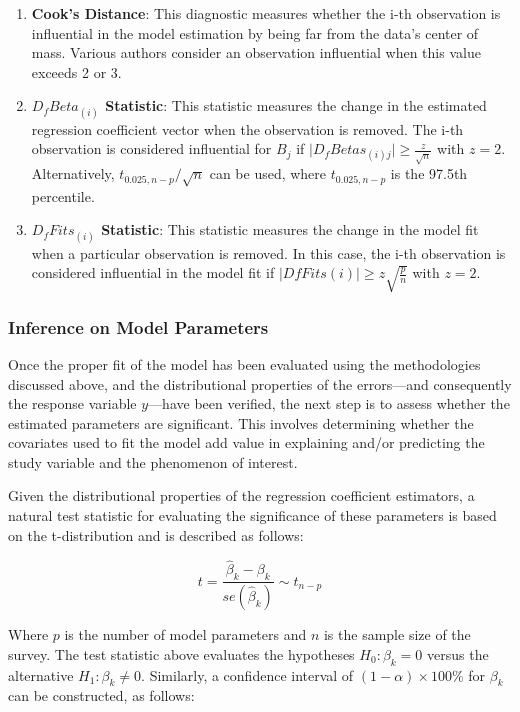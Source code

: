 \documentclass[
  12pt,
]{book}
\providecommand{\tightlist}{%
  \setlength{\itemsep}{0pt}\setlength{\parskip}{0pt}}
\begin{document}
\begin{enumerate}
\def\labelenumi{\arabic{enumi}.}
\tightlist
\item
  \textbf{Cook's Distance}: This diagnostic measures whether the i-th observation is influential in the model estimation by being far from the data's center of mass. Various authors consider an observation influential when this value exceeds 2 or 3.
\item
  \textbf{\(D_fBeta_{(i)}\) Statistic}: This statistic measures the change in the estimated regression coefficient vector when the observation is removed. The i-th observation is considered influential for \(B_j\) if \(\mid D_{f}Betas_{\left(i\right)j}\mid \geq \frac{z}{\sqrt{n}}\) with \(z = 2\). Alternatively, \(t_{0.025,n-p}/\sqrt{n}\) can be used, where \(t_{0.025,n-p}\) is the 97.5th percentile.
\item
  \textbf{\(D_{f}Fits_{\left(i\right)}\) Statistic}: This statistic measures the change in the model fit when a particular observation is removed. In this case, the i-th observation is considered influential in the model fit if \(\mid DfFits\left(i\right)\mid \geq z\sqrt{\frac{p}{n}}\) with \(z = 2\).
\end{enumerate}

\subsubsection{Inference on Model Parameters}\label{inference-on-model-parameters}

Once the proper fit of the model has been evaluated using the methodologies discussed above, and the distributional properties of the errors---and consequently the response variable \(y\)---have been verified, the next step is to assess whether the estimated parameters are significant. This involves determining whether the covariates used to fit the model add value in explaining and/or predicting the study variable and the phenomenon of interest.

Given the distributional properties of the regression coefficient estimators, a natural test statistic for evaluating the significance of these parameters is based on the t-distribution and is described as follows:

\[
t = \frac{\hat{\beta}_{k}-\beta_{k}}{se\left(\hat{\beta}_{k}\right)}\sim t_{n-p}
\]

Where \(p\) is the number of model parameters and \(n\) is the sample size of the survey. The test statistic above evaluates the hypotheses \(H_{0}:\beta_{k}=0\) versus the alternative \(H_{1}:\beta_{k}\neq0\). Similarly, a confidence interval of \((1-\alpha)\times100\%\) for \(\beta_{k}\) can be constructed, as follows:
\end{document}
